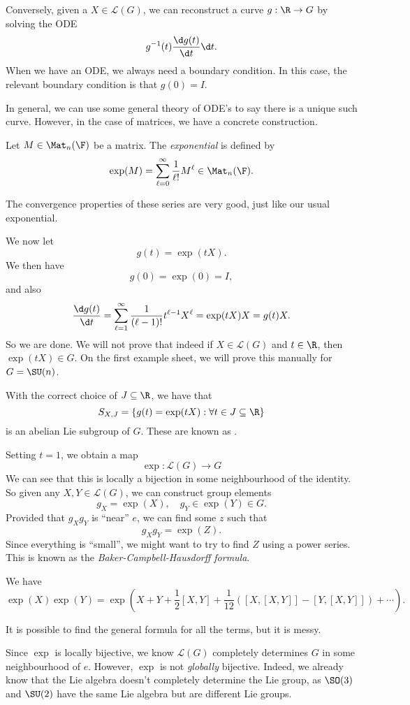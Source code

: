 \documentclass[a4paper]{article}
\begin{document}
Conversely, given a $X \in \mathcal{L}(G)$, we can reconstruct a curve $g: \R \to G$ by solving the ODE
\[
  g^{-1}(t) \frac{\d g(t)}{\d t}\d t.
\]
When we have an ODE, we always need a boundary condition. In this case, the relevant boundary condition is that $g(0) = I$.

In general, we can use some general theory of ODE's to say there is a unique such curve. However, in the case of matrices, we have a concrete construction.
\begin{defi}[Exponential]
  Let $M \in \Mat_n(\F)$ be a matrix. The \emph{exponential} is defined by
  \[
    \exp(M) = \sum_{\ell = 0}^\infty \frac{1}{\ell!} M^\ell \in \Mat_n(\F).
  \]
\end{defi}
The convergence properties of these series are very good, just like our usual exponential.

We now let
\[
  g(t) = \exp(tX).
\]
We then have
\[
  g(0) = \exp(0) = I,
\]
and also
\[
  \frac{\d g(t)}{\d t} = \sum_{\ell = 1}^\infty \frac{1}{(\ell - 1)!} t^{\ell - 1} X^\ell = \exp(tX) X = g(t) X.
\]
So we are done. We will not prove that indeed if $X \in \mathcal{L}(G)$ and $t \in \R$, then $\exp(tX) \in G$. On the first example sheet, we will prove this manually for $G = \SU(n)$.

With the correct choice of $J \subseteq \R$, we have that
\[
  S_{X, J} = \{g(t) = \exp(tX): \forall t \in J \subseteq \R\}
\]
is an abelian Lie subgroup of $G$. These are known as .

Setting $t = 1$, we obtain a map
\[
  \exp: \mathcal{L}(G) \to G
\]
We can see that this is locally a bijection in some neighbourhood of the identity. So given any $X, Y \in \mathcal{L}(G)$, we can construct group elements
\[
  g_X = \exp(X), \quad g_Y \in \exp(Y) \in G.
\]
Provided that $g_X g_Y$ is ``near'' $e$, we can find some $z$ such that
\[
  g_X g_Y = \exp(Z).
\]
Since everything is ``small'', we might want to try to find $Z$ using a power series. This is known as the \emph{Baker-Campbell-Hausdorff formula}.
\begin{thm}
  We have
  \[
    \exp(X) \exp(Y) = \exp\left(X + Y + \frac{1}{2}[X, Y] + \frac{1}{12}([X, [X, Y]] - [Y, [X, Y]]) + \cdots\right).
  \]
\end{thm}
It is possible to find the general formula for all the terms, but it is messy.

Since $\exp$ is locally bijective, we know $\mathcal{L}(G)$ completely determines $G$ in some neighbourhood of $e$. However, $\exp$ is not \emph{globally} bijective. Indeed, we already know that the Lie algebra doesn't completely determine the Lie group, as $\SO(3)$ and $\SU(2)$ have the same Lie algebra but are different Lie groups.
\end{document}
